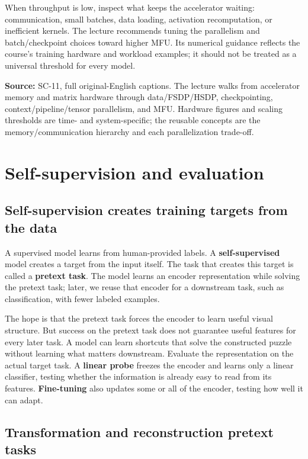 When throughput is low, inspect what keeps the accelerator waiting: communication, small batches, data loading, activation recomputation, or inefficient kernels. The lecture recommends tuning the parallelism and batch/checkpoint choices toward higher MFU. Its numerical guidance reflects the course's training hardware and workload examples; it should not be treated as a universal threshold for every model.

\textbf{Source:} SC-11, full original-English captions. The lecture walks from accelerator memory and matrix hardware through data/FSDP/HSDP, checkpointing, context/pipeline/tensor parallelism, and MFU. Hardware figures and scaling thresholds are time- and system-specific; the reusable concepts are the memory/communication hierarchy and each parallelization trade-off.

\section{Self-supervision and evaluation}\label{04-visual-computing-ii-ch031-self-supervision-and-evaluation}

\subsection{Self-supervision creates training targets from the data}\label{04-visual-computing-ii-ch031-self-supervision-creates-training-targets-from-the-data}

A supervised model learns from human-provided labels. A \textbf{self-supervised} model creates a target from the input itself. The task that creates this target is called a \textbf{pretext task}. The model learns an encoder representation while solving the pretext task; later, we reuse that encoder for a downstream task, such as classification, with fewer labeled examples.

The hope is that the pretext task forces the encoder to learn useful visual structure. But success on the pretext task does not guarantee useful features for every later task. A model can learn shortcuts that solve the constructed puzzle without learning what matters downstream. Evaluate the representation on the actual target task. A \textbf{linear probe} freezes the encoder and learns only a linear classifier, testing whether the information is already easy to read from its features. \textbf{Fine-tuning} also updates some or all of the encoder, testing how well it can adapt.

\subsection{Transformation and reconstruction pretext tasks}\label{04-visual-computing-ii-ch031-transformation-and-reconstruction-pretext-tasks}


